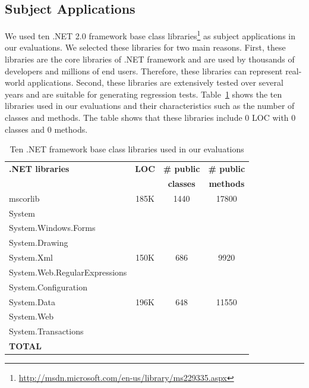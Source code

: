 \subsection{Subject Applications}

We used ten .NET 2.0 framework base class 
libraries\footnote{\url{http://msdn.microsoft.com/en-us/library/ms229335.aspx}} as subject applications in our
evaluations. We selected these libraries for two main reasons. First, these libraries
are the core libraries of .NET framework and are used by thousands
of developers and millions of end users. Therefore, these libraries can
represent real-world applications. Second, these libraries are extensively
tested over several years and are suitable for generating regression tests. 
Table~\ref{tab:subjects} shows the ten libraries used in our 
evaluations and their characteristics such as the number of classes and 
methods. The table shows that these libraries include $0$ LOC with
$0$ classes and $0$ methods.

\setlength{\tabcolsep}{1pt}
\begin{table}[t]
\begin{SmallOut}
\begin{CodeOut}
\begin{center}
\begin {tabular} {|l|c|c|c|}
\hline
\textbf{.NET libraries} & \textbf{LOC} & \textbf{\# public} & \textbf{\# public}\\ 
 & & \textbf{classes} & \textbf{methods}\\ 
\hline
\hline  mscorlib & 185K & 1440 & 17800 \\
\hline  System &  & & \\
\hline  System.Windows.Forms & & & \\
\hline  System.Drawing & & & \\
\hline  System.Xml & 150K & 686 & 9920 \\
\hline  System.Web.RegularExpressions & & & \\
\hline  System.Configuration & & & \\
\hline  System.Data & 196K & 648 & 11550 \\
\hline  System.Web &  & & \\
\hline  System.Transactions & & & \\
\hline \textbf{TOTAL} &  &  &   \\
\hline
\end{tabular}
\end{center}
\end{CodeOut}
\end{SmallOut}\vspace*{-4ex}
\centering \caption {\label{tab:subjects}Ten .NET framework base class libraries used in our evaluations}
\end{table}

